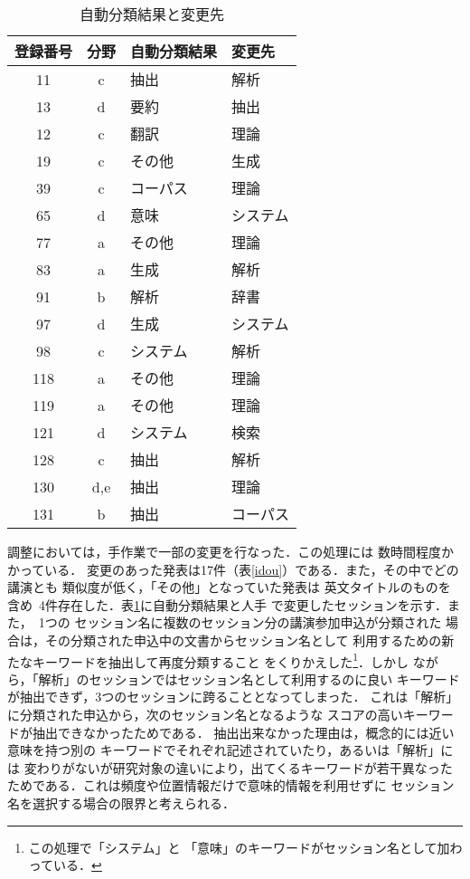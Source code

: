 \begin{table}
\begin{center}
\caption[表]{\label{henko}自動分類結果と変更先}
\footnotesize 
\begin{tabular}{|c|c|l|l|}\hline
登録番号 & 分野 & 自動分類結果 & 変更先 \\\hline
 11 & c & 抽出 & 解析 \\\hline
 13 & d & 要約 & 抽出 \\\hline
 12 & c & 翻訳 & 理論 \\\hline
 19 & c & その他 & 生成 \\\hline
 39 & c & コーパス & 理論 \\\hline
 65 & d & 意味 & システム \\\hline
 77 & a & その他 & 理論 \\\hline
 83 & a & 生成 & 解析 \\\hline
 91 & b & 解析 & 辞書 \\\hline
 97 & d & 生成 & システム \\\hline
 98 & c & システム & 解析 \\\hline
118 & a & その他 & 理論 \\\hline
119 & a & その他 & 理論 \\\hline
121 & d & システム & 検索 \\\hline
128 & c & 抽出 & 解析 \\\hline
130 & d,e & 抽出 & 理論 \\\hline
131 & b & 抽出 & コーパス\\\hline
\end{tabular}
\end{center}
\end{table}

調整においては，手作業で一部の変更を行なった．この処理には
数時間程度かかっている．
変更のあった発表は17件（表\ref{idou}）である．また，その中でどの講演とも
類似度が低く，「その他」となっていた発表は
英文タイトルのものを含め\ 4件存在した．表\ref{henko}に自動分類結果と人手
で変更したセッションを示す．また，\ 1つの
セッション名に複数のセッション分の講演参加申込が分類された
場合は，その分類された申込中の文書からセッション名として
利用するための新たなキーワードを抽出して再度分類すること
をくりかえした\footnote{この処理で「システム」と
「意味」のキーワードがセッション名として加わっている．}．しかし
ながら，「解析」のセッションではセッション名として利用するのに良い
キーワードが抽出できず，3つのセッションに跨ることとなってしまった．
これは「解析」に分類された申込から，次のセッション名となるような
スコアの高いキーワードが抽出できなかったためである．
抽出出来なかった理由は，概念的には近い意味を持つ別の
キーワードでそれぞれ記述されていたり，あるいは「解析」には
変わりがないが研究対象の違いにより，出てくるキーワードが若干異なった
ためである．これは頻度や位置情報だけで意味的情報を利用せずに
セッション名を選択する場合の限界と考えられる．

